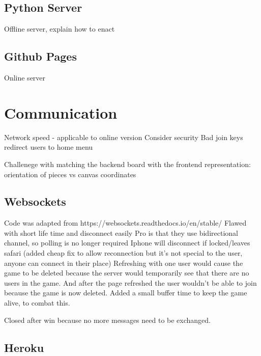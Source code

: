 \subsection{Python Server}

Offline server, explain how to enact

\subsection{Github Pages}

Online server

\section{Communication}

Network speed - applicable to online version\linebreak
Consider security\linebreak
Bad join keys redirect users to home menu

Challenege with matching the backend board with the frontend representation: orientation of pieces vs canvas coordinates

\subsection{Websockets}
Code was adapted from https://websockets.readthedocs.io/en/stable/\linebreak
Flawed with short life time and disconnect easily\linebreak
Pro is that they use bidirectional channel, so polling is no longer required\linebreak
Iphone will disconnect if locked/leaves safari (added cheap fix to allow reconnection but it's not special to the user, anyone can connect in their place)\linebreak
Refreshing with one user would cause the game to be deleted because the server would temporarily see that there are no users in the game. And after the page refreshed the user wouldn't be able to join because the game is now deleted. Added a small buffer time to keep the game alive, to combat this.\linebreak

Closed after win because no more messages need to be exchanged.

\subsection{Heroku}

